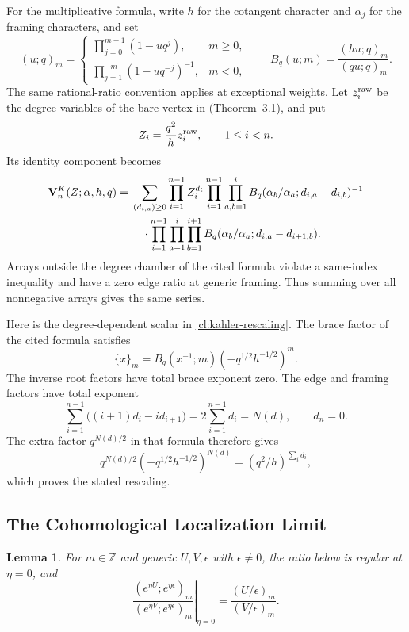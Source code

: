 \documentclass[11pt]{amsart}
\newtheorem{lemma}[theorem]{Lemma}
\theoremstyle{definition}
\theoremstyle{remark}
\numberwithin{equation}{section}
\newcommand{\Z}{\mathbb Z}
\newcommand{\eps}{\epsilon}
\begin{document}
For the multiplicative formula, write $h$ for the cotangent
character and $\alpha_j$ for the framing characters, and set
\[
 (u;q)_m=\begin{cases}
 \prod_{j=0}^{m-1}(1-uq^j),&m\geq0,\\
 \displaystyle\prod_{j=1}^{-m}(1-uq^{-j})^{-1},&m<0,
 \end{cases}
 \qquad B_q(u;m)=\frac{(hu;q)_m}{(qu;q)_m}.
\]
The same rational-ratio convention applies at exceptional weights.
Let $z_i^{\rm raw}$ be the degree variables of the bare vertex in
\cite{KZ21} (Theorem~3.1), and put
\begin{equation}\label{cl:kahler-rescaling}
 Z_i=\frac{q^2}{h}z_i^{\rm raw},\qquad 1\leq i<n.
\end{equation}
Its identity component becomes
\begin{align}\label{cl:k-localization}
 \mathbf V_n^K(Z;\alpha,h,q)
 ={}&\sum_{(d_{i,a})\geq0}\prod_{i=1}^{n-1}Z_i^{d_i}
 \prod_{i=1}^{n-1}\prod_{a,b=1}^{i}
 B_q(\alpha_b/\alpha_a;d_{i,a}-d_{i,b})^{-1}\notag\\
 &\quad\cdot\prod_{i=1}^{n-1}\prod_{a=1}^{i}\prod_{b=1}^{i+1}
 B_q(\alpha_b/\alpha_a;d_{i,a}-d_{i+1,b}).
\end{align}
Arrays outside the degree chamber of the cited formula violate a
same-index inequality and have a zero edge ratio at generic
framing. Thus summing over all nonnegative arrays gives the same
series.

Here is the degree-dependent scalar in
\eqref{cl:kahler-rescaling}. The brace factor of the cited
formula satisfies
\[
 \{x\}_m=B_q(x^{-1};m)(-q^{1/2}h^{-1/2})^m.
\]
The inverse root factors have total brace exponent zero. The
edge and framing factors have total exponent
\[
 \sum_{i=1}^{n-1}\bigl((i+1)d_i-id_{i+1}\bigr)
 =2\sum_{i=1}^{n-1}d_i=N(d),\qquad d_n=0.
\]
The extra factor $q^{N(d)/2}$ in that formula therefore gives
\[
 q^{N(d)/2}(-q^{1/2}h^{-1/2})^{N(d)}
 =(q^2/h)^{\sum_i d_i},
\]
which proves the stated rescaling.

\subsection{The Cohomological Localization Limit}
\begin{lemma}\label{dg:pochhammer}
For $m\in\Z$ and generic $U,V,\eps$ with $\eps\ne0$, the ratio
below is regular at $\eta=0$, and
\begin{equation}\label{dg:pochhammer-limit}
 \left.
 \frac{(e^{\eta U};e^{\eta\eps})_m}
      {(e^{\eta V};e^{\eta\eps})_m}
 \right|_{\eta=0}
 =\frac{(U/\eps)_m}{(V/\eps)_m}.
\end{equation}
\end{lemma}
\end{document}
